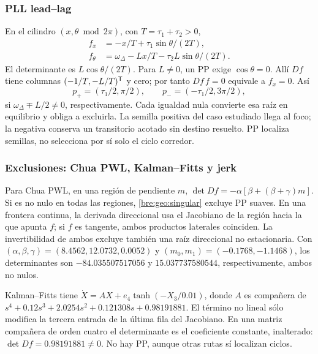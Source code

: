 \subsubsection{PLL lead--lag}
En el cilindro $(x,\theta\bmod2\pi)$, con $T=\tau_1+\tau_2>0$,
\begin{equation}
 \begin{aligned}
 f_x&=-x/T+\tau_1\sin\theta/(2T),\\
 f_\theta&=\omega_\Delta-Lx/T-\tau_2L\sin\theta/(2T).
 \end{aligned}
 \label{bre:geo:pll}
\end{equation}
El determinante es $L\cos\theta/(2T)$. Para $L\ne0$, un PP exige
$\cos\theta=0$. Allí $Df$ tiene columnas $(-1/T,-L/T)^{\mathsf T}$ y cero;
por tanto $Df\,f=0$ equivale a $f_x=0$. Así
\begin{equation}
 p_+=(\tau_1/2,\pi/2),\qquad
 p_-=(-\tau_1/2,3\pi/2),
 \label{bre:geo:pll-roots}
\end{equation}
si $\omega_\Delta\mp L/2\ne0$, respectivamente. Cada igualdad nula
convierte esa raíz en equilibrio y obliga a excluirla. La semilla positiva
del caso estudiado llega al foco; la negativa conserva un transitorio
acotado sin destino resuelto. PP localiza semillas, no selecciona por sí
solo el ciclo corredor.

\subsubsection{Exclusiones: Chua PWL, Kalman--Fitts y jerk}
Para Chua PWL, en una región de pendiente $m$,
$\det Df=-\alpha[\beta+(\beta+\gamma)m]$. Si es no nulo en todas las
regiones, \eqref{bre:geo:singular} excluye PP suaves. En una frontera
continua, la derivada direccional usa el Jacobiano de la región hacia la
que apunta $f$; si $f$ es tangente, ambos productos laterales coinciden.
La invertibilidad de ambos excluye también una raíz direccional no
estacionaria. Con $(\alpha,\beta,\gamma)=(8.4562,12.0732,0.0052)$ y
$(m_0,m_1)=(-0.1768,-1.1468)$, los determinantes son
$-84.035507517056$ y $15.037737580544$, respectivamente, ambos no nulos.

Kalman--Fitts tiene $\dot X=AX+e_4\tanh(-X_3/0.01)$, donde $A$ es
compañera de $s^4+0.12s^3+2.0254s^2+0.121308s+0.98191881$.
El término no lineal sólo modifica la tercera entrada de la última fila
del Jacobiano. En una matriz compañera de orden cuatro el determinante
es el coeficiente constante, inalterado: $\det Df=0.98191881\ne0$.
No hay PP, aunque otras rutas sí localizan ciclos.

